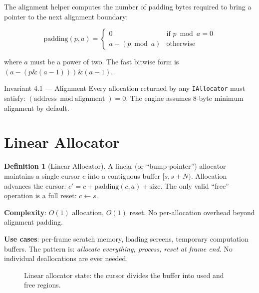 \documentclass[12pt, a4paper]{report}
\theoremstyle{definition}
\newtheorem{definition}{Definition}[section]
\theoremstyle{remark}
\begin{document}
The alignment helper computes the number of padding bytes required to
bring a pointer to the next alignment boundary:

\begin{equation}
\text{padding}(p, a) =
\begin{cases}
  0 & \text{if } p \bmod a = 0 \\
  a - (p \bmod a) & \text{otherwise}
\end{cases}
\end{equation}

where $a$ must be a power of two. The fast bitwise form is
$(a - (p \mathbin{\&} (a-1))) \mathbin{\&} (a-1)$.

\begin{specbox}{Invariant 4.1 — Alignment}
  Every allocation returned by any \texttt{IAllocator} must satisfy:
  $(\text{address} \bmod \text{alignment}) = 0$.
  The engine assumes 8-byte minimum alignment by default.
\end{specbox}

\section{Linear Allocator}

\begin{definition}[Linear Allocator]
A linear (or ``bump-pointer'') allocator maintains a single cursor
$c$ into a contiguous buffer $[s, s+N)$. Allocation advances the cursor:
$c' = c + \text{padding}(c, a) + \text{size}$.
The only valid ``free'' operation is a full reset: $c \gets s$.
\end{definition}

\textbf{Complexity}: $O(1)$ allocation, $O(1)$ reset. No per-allocation
overhead beyond alignment padding.

\textbf{Use cases}: per-frame scratch memory, loading screens, temporary
computation buffers. The pattern is: \emph{allocate everything, process,
reset at frame end}. No individual deallocations are ever needed.

\begin{figure}[H]
\centering
{}
\caption{Linear allocator state: the cursor divides the buffer into used and free regions.}
\end{figure}
\end{document}
